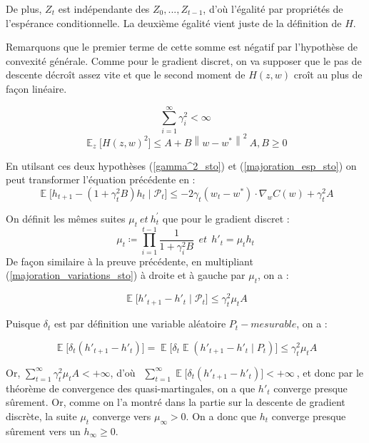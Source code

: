 \documentclass{article}
\DeclareMathOperator*{\E}{\mathbb{E}} %
\begin{document}
De plus, $Z_t$ est indépendante des $Z_0,...,Z_{t-1}$, d'où l'égalité par propriétés de l'espérance conditionnelle. La deuxième égalité vient juste de la définition de $H$.

Remarquons que le premier terme de cette somme est négatif par l'hypothèse de convexité générale. Comme pour le gradient discret, on va supposer que le pas de descente décroît assez vite  et que le second moment de $H(z,w)$ croît au plus de façon linéaire.

\bigskip
\begin{equation} \label{gamma^2_sto} 
    \sum_{i=1}^{\infty} \gamma_i^2 < \infty
\end{equation} 
\begin{equation}\label{majoration_esp_sto}
    {\textstyle \E_z} \big[H(z,w)^2\big] \leq A + B\left\|w-w^*\right\|^2 ~ A,B \geq 0
\end{equation}


En utilsant ces deux hypothèses (\ref{gamma^2_sto}) et (\ref{majoration_esp_sto}) on peut transformer l'équation précédente en :
\begin{equation}\label{majoration_variations_sto}
    \E\big[h_{t+1}-(1+\gamma_t^2B)h_t \mid \mathcal{P}_t\big]\leq -2\gamma_t(w_t-w^*) \cdot \nabla_wC(w)+\gamma_t^2A
\end{equation}

On définit les mêmes suites $\mu_t~et~h_t^{'}$ que pour le gradient discret : 
\begin{equation*}
    \mu_t \coloneqq \prod_{i=1}^{t-1} \frac{1}{1 + \gamma_i^{2}B}~~et~~h'_t=\mu_th_t
\end{equation*}
\bigskip
De façon similaire à la preuve précédente, en multipliant (\ref{majoration_variations_sto}) à droite et à gauche par $\mu_t$, on a :

\begin{equation*}
    \E\big[h'_{t+1}-h'_{t} \mid \mathcal{P}_t\big]\leq\gamma_t^2\mu_tA
\end{equation*}
\bigskip

Puisque $\delta_t$ est par définition une variable aléatoire $P_t-mesurable$, on a : 

\begin{equation*}
    \E\big[\delta_t(h'_{t+1}-h'_{t})\big]=\E\big[\delta_t \E(h'_{t+1}-h'_{t} \mid P_t)\big]\leq\gamma_t^2\mu_tA
\end{equation*}
\bigskip

Or, $\sum_{t=1}^{\infty} \gamma_t^2 \mu_t A < +\infty$, d'où $~~\sum_{t=1}^{\infty} \E\big[\delta_t(h'_{t+1}-h'_{t})\big] < +\infty~$, et donc par le théorème de convergence des quasi-martingales, on a que $h'_t$ converge presque sûrement. Or, comme on l'a montré dans la partie sur la descente de gradient discrète, la suite $\mu_t$ converge vers $\mu_{\infty} > 0$. On a donc que $h_t$ converge presque sûrement vers un $h_\infty \geq 0$.
\bigskip
\end{document}
